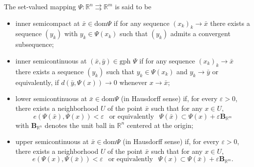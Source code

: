 \begin{definition}
The set-valued mapping $\Psi:\mathbb{R}^{n}\rightrightarrows\mathbb{R}^{m}$
is said to be
\begin{itemize}
  \item[(i)] inner semicompact at $\bar{x}\in\mathrm{dom}\Psi$ if for any
sequence $(x_{k})_{k}\rightarrow\bar{x}$ there exists a sequence $(y_{k})$
with $y_{k}\in\Psi(x_{k})$ such that $(y_{k})$ admits a convergent
subsequence;
\item[(ii)]  inner semicontinuous at $(\bar{x},\bar
{y})\in\mbox{gph }\Psi$ if for any sequence $(x_{k})_{k}\rightarrow\bar{x}$
there exists a sequence $(y_{k})$ such that $y_{k}\in\Psi(x_{k})$ and
$y_{k}\rightarrow\bar{y}$ or equivalently, if $d(\bar{y},\Psi(x))\rightarrow0$
whenever $x\rightarrow\bar{x}$;
\item[(iii)] lower semicontinuous at $\bar{x}
\in\mathrm{dom}\Psi$ (in Hausdorff sense) if, for every $\varepsilon
>0$, there exists a neighborhood $U$ of the point $\bar{x}$ such that for any $x\in U$,
\[
e(\Psi(\bar{x}),\Psi(x))<\varepsilon \;\, \mbox{ or equivalently } \;\, \Psi(\bar{x})\subset\Psi(x)+\varepsilon\boldsymbol{B}_{\mathbb{R}^{m}}
\]
 with $\boldsymbol{B}_{\mathbb{R}^{n}}$  denotes the unit ball in $\mathbb{R}^{n}$ centered at the origin;
\item[(iv)] upper semicontinuous at $\bar{x}\in\mathrm{dom}\Psi$
(in Hausdorff sense) if, for every $\varepsilon>0$, there exists a
neighborhood $U$ of the point $\bar{x}$ such that for any $x\in U$,
\[
e(\Psi(x),\Psi(\bar{x}))<\varepsilon  \;\, \mbox{ or equivalently } \;\,\Psi(x)\subset\Psi(\bar{x})+\varepsilon\boldsymbol{B}_{\mathbb{R}^{m}}.
\]

\end{itemize}
\end{definition}

